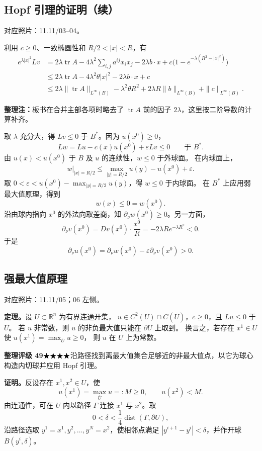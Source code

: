\documentclass[UTF8,a4paper,11pt,fontset=fandol]{ctexart}
\newcommand{\R}{\mathbb R}
\newcommand{\Ub}{\overline U}
\newcommand{\ednote}[1]{\par{\small\color{notegray}\textbf{整理注：}#1}\par}
\newcommand{\source}[1]{{\small\color{notegray}对应照片：#1。}\par}
\newcommand{\proofstars}[1]{\ensuremath{%
\ifnum#1>0\relax\bigstar\fi
\ifnum#1>1\relax\bigstar\fi
\ifnum#1>2\relax\bigstar\fi
\ifnum#1>3\relax\bigstar\fi
\ifnum#1>4\relax\bigstar\fi}}
\newcommand{\proofrating}[3]{\par{\small\color{proofblue}%
\textbf{整理评级 #1}\enspace\proofstars{#2}\quad #3\par}}
\begin{document}
\subsection*{Hopf 引理的证明（续）}
\source{11.11/03--04}
利用 $c\geq0$、一致椭圆性和 $R/2<|x|<R$，有
\[
\begin{aligned}
e^{\lambda |x|^2}Lv
&=2\lambda\operatorname{tr}A
  -4\lambda^2\sum_{i,j}a^{ij}x_ix_j
  -2\lambda b\cdot x+c\bigl(1-e^{-\lambda(R^2-|x|^2)}\bigr)\\
&\leq 2\lambda\operatorname{tr}A-4\lambda^2\theta|x|^2
  -2\lambda b\cdot x+c\\
&\leq 2\lambda\|\operatorname{tr}A\|_{L^\infty(B)}
  -\lambda^2\theta R^2
  +2\lambda R\|b\|_{L^\infty(B)}+\|c\|_{L^\infty(B)}.
\end{aligned}
\]
\ednote{板书在合并主部各项时略去了 $\operatorname{tr}A$ 前的因子 $2\lambda$，这里按二阶导数的计算补齐。}
取 $\lambda$ 充分大，得 $Lv\leq0$ 于 $B^*$。因为 $u(x^0)\geq0$，
\[
Lw=Lu-c(x)u(x^0)+\varepsilon Lv\leq0\qquad\text{于 }B^*.
\]
由 $u(x)<u(x^0)$ 于 $B$ 及 $u$ 的连续性，$w\leq0$ 于外球面。
在内球面上，
\[
\left.w\right|_{|x|=R/2}
\leq\max_{|y|=R/2}u(y)-u(x^0)+\varepsilon .
\]
取 $0<\varepsilon<u(x^0)-\max_{|y|=R/2}u(y)$，得 $w\leq0$ 于内球面。
在 $B^*$ 上应用弱最大值原理，得到
\[
w(x)\leq0=w(x^0).
\]
沿由球内指向 $x^0$ 的外法向取差商，知
$\partial_\nu w(x^0)\geq0$。另一方面，
\[
\partial_\nu v(x^0)
=Dv(x^0)\cdot\frac{x^0}{R}
=-2\lambda R e^{-\lambda R^2}<0.
\]
于是
\[
\boxed{\partial_\nu u(x^0)
=\partial_\nu w(x^0)-\varepsilon\partial_\nu v(x^0)>0.}
\]

\newpage
\subsection{强最大值原理}
\source{11.11/05；06 左侧}
\textbf{定理。}设 $U\subset\R^n$ 为有界连通开集，
$u\in C^2(U)\cap C(\Ub)$，$c\geq0$，且 $Lu\leq0$ 于 $U$。
若 $u$ 非常数，则 $u$ 的非负最大值只能在 $\partial U$ 上取到。
换言之，若存在 $x^1\in U$ 使 $u(x^1)=\max_{\Ub}u\geq0$，
则 $u$ 在 $U$ 上为常数。

\proofrating{49}{4}{沿路径找到离最大值集合足够近的非最大值点，以它为球心构造内切球并应用 Hopf 引理。}
\textbf{证明。}反设存在 $x^1,x^2\in U$，使
\[
u(x^1)=\max_{\Ub}u=:M\geq0,\qquad u(x^2)<M.
\]
由连通性，可在 $U$ 内以路径 $\Gamma$ 连接 $x^1$ 与 $x^2$。取
\[
0<\delta<\frac14\operatorname{dist}(\Gamma,\partial U),
\]
沿路径选取 $y^1=x^1,y^2,\ldots,y^N=x^2$，使相邻点满足
$|y^{i+1}-y^i|<\delta$，并作开球 $B(y^i,\delta)$。
\end{document}
